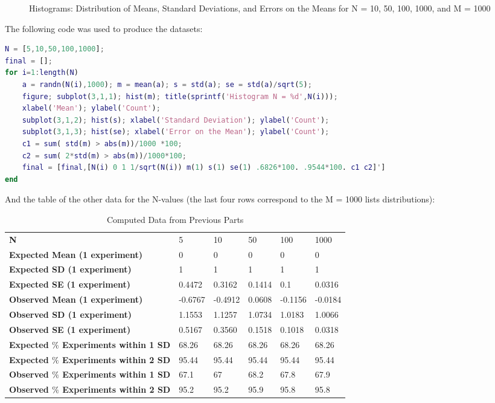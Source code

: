 \documentclass{article}
\begin{document}
\begin{enumerate}
\begin{figure}[H]
    \caption{Histograms: Distribution of Means, Standard Deviations, and Errors on the Means for N = 10, 50, 100, 1000, and M = 1000}
    \label{fig:my_label}
\end{figure}
            The following code was used to produce the datasets:
            \begin{lstlisting}[language=Matlab, caption=Matlab code]
N = [5,10,50,100,1000];
final = [];
for i=1:length(N)
    a = randn(N(i),1000); m = mean(a); s = std(a); se = std(a)/sqrt(5);
    figure; subplot(3,1,1); hist(m); title(sprintf('Histogram N = %d',N(i)));
    xlabel('Mean'); ylabel('Count'); 
    subplot(3,1,2); hist(s); xlabel('Standard Deviation'); ylabel('Count'); 
    subplot(3,1,3); hist(se); xlabel('Error on the Mean'); ylabel('Count');
    c1 = sum( std(m) > abs(m))/1000 *100;
    c2 = sum( 2*std(m) > abs(m))/1000*100;
    final = [final,[N(i) 0 1 1/sqrt(N(i)) m(1) s(1) se(1) .6826*100. .9544*100. c1 c2]']
end
            \end{lstlisting}
            
            And the table of the other data for the N-values (the last four rows correspond to the M = 1000 lists distributions):
            \begin{table}[H]
            \centering
        \centering
        \caption{Computed Data from Previous Parts}
        \label{my-label}
        \begin{tabular}{llllll}
        \textbf{N} & 5 & 10 & 50 & 100 & 1000 \\
        \textbf{Expected Mean (1 experiment)} & 0 & 0 & 0 & 0 & 0 \\
        \textbf{Expected SD (1 experiment)} & 1 & 1 & 1 & 1 & 1 \\
        \textbf{Expected SE (1 experiment)} & 0.4472 & 0.3162 & 0.1414 & 0.1 & 0.0316 \\
        \textbf{Observed Mean (1 experiment)} & -0.6767 & -0.4912 & 0.0608 & -0.1156 & -0.0184 \\
        \textbf{Observed SD (1 experiment)} & 1.1553 & 1.1257 & 1.0734 & 1.0183 & 1.0066 \\
        \textbf{Observed SE (1 experiment)} & 0.5167 & 0.3560 & 0.1518 & 0.1018 & 0.0318 \\
        \textbf{Expected $\%$ Experiments within 1 SD} & 68.26 & 68.26 & 68.26 & 68.26 & 68.26 \\
        \textbf{Expected $\%$ Experiments within 2 SD} & 95.44 & 95.44 & 95.44 & 95.44 & 95.44 \\
        \textbf{Observed $\%$ Experiments within 1 SD} & 67.1 & 67 & 68.2 & 67.8 & 67.9 \\
        \textbf{Observed $\%$ Experiments within 2 SD} & 95.2 & 95.2 & 95.9 & 95.8 & 95.8
        \end{tabular}
        \end{table}
        \end{enumerate}
\end{document}
